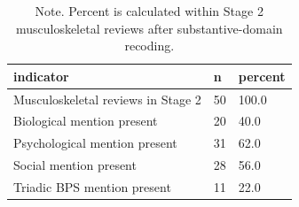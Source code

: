 \begin{table}[htbp]
\raggedright
\caption{Primary Research Question 2. Substantive scope and triadic coverage in musculoskeletal reviews.}
\label{tab.msk.scope}
\begin{tabular}{lll}
\toprule
indicator & n & percent \\
\midrule
Musculoskeletal reviews in Stage 2 & 50 & 100.0 \\
Biological mention present & 20 & 40.0 \\
Psychological mention present & 31 & 62.0 \\
Social mention present & 28 & 56.0 \\
Triadic BPS mention present & 11 & 22.0 \\
\bottomrule
\end{tabular}

\caption*{Note. Percent is calculated within Stage 2 musculoskeletal reviews after substantive-domain recoding.}
\end{table}
